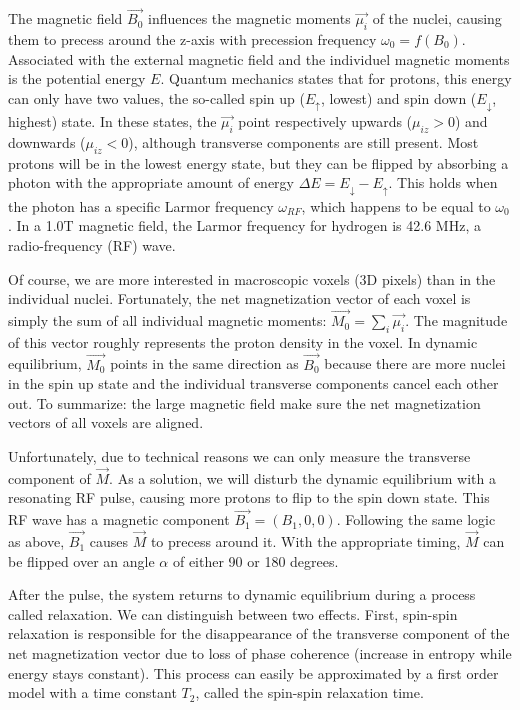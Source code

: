The magnetic field $\vec{B_0}$ influences the magnetic moments $\vec{\mu_i}$ of
the nuclei, causing them to precess around the z-axis with precession frequency
$\omega_0 = f(B_0)$. Associated with the external magnetic field and the
individuel magnetic moments is the potential energy $E$. Quantum mechanics
states that for protons, this energy can only have two values, the so-called
spin up ($E_\uparrow$, lowest) and spin down ($E_\downarrow$, highest) state. In
these states, the $\vec{\mu_i}$ point respectively upwards ($\mu_{iz} > 0$) and
downwards ($\mu_{iz} < 0$), although transverse components are still present.
Most protons will be in the lowest energy state, but they can be flipped by absorbing
a photon with the appropriate amount of energy $\Delta E = E_\downarrow -
E_\uparrow$. This holds when the photon has a specific Larmor frequency
$\omega_{RF}$, which happens to be equal to $\omega_0$. In a 1.0T magnetic
field, the Larmor frequency for hydrogen is 42.6 MHz, a radio-frequency (RF) wave.

Of course, we are more interested in macroscopic voxels (3D pixels) than in the
individual nuclei. Fortunately, the net magnetization vector of each voxel is
simply the sum of all individual magnetic moments: $\vec{M_0} = \sum_i
\vec{\mu_i}$. The magnitude of this vector roughly represents the proton density
in the voxel. In dynamic equilibrium, $\vec{M_0}$ points in the same direction
as $\vec{B_0}$ because there are more nuclei in the spin up state and the
individual transverse components cancel each other out. To summarize: the large
magnetic field make sure the net magnetization vectors of all voxels are
aligned.

Unfortunately, due to technical reasons we can only measure the transverse
component of $\vec{M}$. As a solution, we will disturb the dynamic equilibrium
with a resonating RF pulse, causing more protons to flip to the spin down state.
This RF wave has a magnetic component $\vec{B_1} = (B_1, 0, 0)$. Following the
same logic as above, $\vec{B_1}$ causes $\vec{M}$ to precess around it. With the
appropriate timing, $\vec{M}$ can be flipped over an angle $\alpha$ of either 90
or 180 degrees.

After the pulse, the system returns to dynamic equilibrium during a process
called relaxation. We can distinguish between two effects. First, spin-spin
relaxation is responsible for the disappearance of the transverse component of
the net magnetization vector due to loss of phase coherence (increase in
entropy while energy stays constant). This process can easily be approximated
by a first order model with a time constant $T_2$, called the spin-spin
relaxation time.

